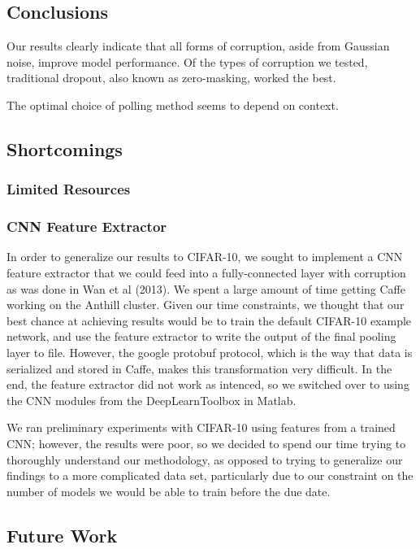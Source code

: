 \documentclass{article} %
\begin{document}
\subsection{Conclusions}

Our results clearly indicate that all forms of corruption, aside from Gaussian noise, improve model performance. Of the types of corruption we tested, traditional dropout, also known as zero-masking, worked the best.

The optimal choice of polling method seems to depend on context.

\subsection{Shortcomings}
\label{subsec:shortcomings}

\subsubsection{Limited Resources}

\subsubsection{CNN Feature Extractor}

In order to generalize our results to CIFAR-10, we sought to implement a CNN feature extractor that we could feed into a fully-connected layer with corruption as was done in Wan et al (2013). We spent a large amount of time getting Caffe working on the Anthill cluster. Given our time constraints, we thought that our best chance at achieving results would be to train the default CIFAR-10 example network, and use the feature extractor to write the output of the final pooling layer to file. However, the google protobuf protocol, which is the way that data is serialized and stored in Caffe, makes this transformation very difficult. In the end, the feature extractor did not work as intenced, so we switched over to using the CNN modules from the DeepLearnToolbox in Matlab.


We ran preliminary experiments with CIFAR-10 using features from a trained CNN; however, the results were poor, so we decided to spend our time trying to thoroughly understand our methodology, as opposed to trying to generalize our findings to a more complicated data set, particularly due to our constraint on the number of models we would be able to train before the due date.

\subsection{Future Work}
\end{document}
